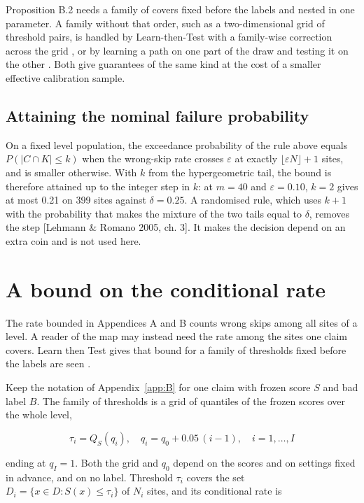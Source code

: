 \documentclass{iopjournal}
\begin{document}
Proposition B.2 needs a family of covers fixed before the labels and nested in one parameter. A family without that order, such as a two-dimensional grid of threshold pairs, is handled by Learn-then-Test with a family-wise correction across the grid \cite{Angelopoulos2025}, or by learning a path on one part of the draw and testing it on the other \cite{LauferGoldshtein2023}. Both give guarantees of the same kind at the cost of a smaller effective calibration sample.

\hypertarget{attaining-the-nominal-failure-probability}{%
\subsection{Attaining the nominal failure probability}\label{attaining-the-nominal-failure-probability}}

On a fixed level population, the exceedance probability of the rule above equals \(P(|C \cap K| \le k)\) when the wrong-skip rate crosses \(\varepsilon\) at exactly \(\lfloor \varepsilon N \rfloor + 1\) sites, and is smaller otherwise. With \(k\) from the hypergeometric tail, the bound is therefore attained up to the integer step in \(k\): at \(m = 40\) and \(\varepsilon = 0.10\), \(k = 2\) gives at most 0.21 on 399 sites against \(\delta = 0.25\). A randomised rule, which uses \(k + 1\) with the probability that makes the mixture of the two tails equal to \(\delta\), removes the step {[}Lehmann \& Romano 2005, ch. 3{]}. It makes the decision depend on an extra coin and is not used here.

\hypertarget{app:C}{%
\section{A bound on the conditional rate}\label{app:C}}

The rate bounded in Appendices A and B counts wrong skips among all sites of a level. A reader of the map may instead need the rate among the sites one claim covers. Learn then Test gives that bound for a family of thresholds fixed before the labels are seen \cite{Angelopoulos2025}.

Keep the notation of Appendix~\ref{app:B} for one claim with frozen score \(S\) and bad label \(B\). The family of thresholds is a grid of quantiles of the frozen scores over the whole level,

\[
\tau_i = Q_S(q_i), \quad q_i = q_0 + 0.05\,(i - 1), \quad i = 1, \dots, I
\]

ending at \(q_I = 1\). Both the grid and \(q_0\) depend on the scores and on settings fixed in advance, and on no label. Threshold \(\tau_i\) covers the set \(D_i = \{x \in D : S(x) \le \tau_i\}\) of \(N_i\) sites, and its conditional rate is
\end{document}
